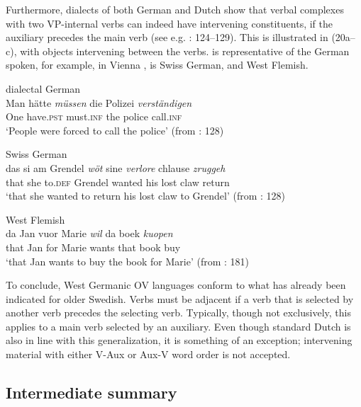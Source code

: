 \documentclass[output=paper, colorlinks, citecolor=brown]{langscibook}
\begin{document}
Furthermore, dialects of both German and Dutch show that verbal complexes with two VP-internal verbs can indeed have intervening constituents, if the auxiliary precedes the main verb (see e.g. \citealt{Sapp2011}: 124–129). This is illustrated in (20a–c), with objects intervening between the verbs.  is representative of the German spoken, for example, in Vienna \citep[128]{Haider2013},  is Swiss German, and  West Flemish.


\ea 
\label{ex:sangfelt:20}
\ea dialectal German\label{ex:sangfelt:20a}\\
\gll Man hätte \textit{müssen} {die} {Polizei} \textit{verständigen} \\
 One have.\textsc{pst} must.\textsc{inf} the police call.\textsc{inf} \\
\glt ‘People were forced to call the police’ (from \citealt{Haider2013}: 128)

\ex Swiss German\label{ex:sangfelt:20b}\\
\gll das si am Grendel \textit{wöt} {sine} {\textit{verlore}} {chlause} \textit{zruggeh}\\
 that she to.\textsc{def} Grendel wanted his lost claw return \\
\glt ‘that she wanted to return his lost claw to Grendel’ (from \citealt{Haider2013}: 128)

\ex West Flemish\label{ex:sangfelt:20c}\\
\gll da Jan vuor Marie \textit{wil} {da} {boek} \textit{kuopen} \\
 that Jan for Marie wants that book buy \\
\glt ‘that Jan wants to buy the book for Marie’ (from \citealt{Haegeman1992}: 181)\\
\z
\z

To conclude, West Germanic OV languages conform to what has already been indicated for older Swedish. Verbs must be adjacent if a verb that is selected by another verb precedes the selecting verb. Typically, though not exclusively, this applies to a main verb selected by an auxiliary. Even though standard Dutch is also in line with this generalization, it is something of an exception; intervening material with either V-Aux or Aux-V word order is not accepted.

\subsection{Intermediate summary}\label{sec:sangfelt:3.4}
\end{document}
